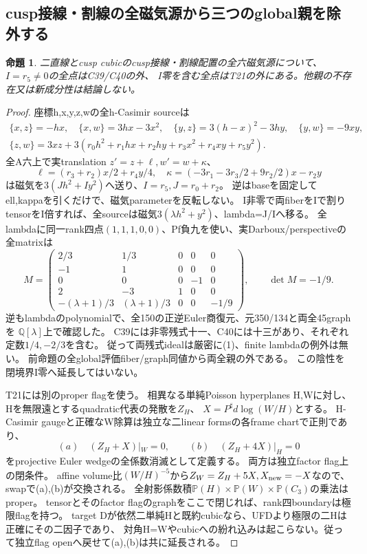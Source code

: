 \documentclass[a4paper,11pt]{ltjsarticle}
\newtheorem{proposition}{命題}[section]
\theoremstyle{definition}
\begin{document}
\subsection{cusp接線・割線の全磁気源から三つのglobal親を除外する}
\begin{proposition}\label{prop:cusp-tangent-secant-three-parent-exclusion}
二直線とcusp cubicのcusp接線・割線配置の全六磁気源について、$I=r_5\ne0$の全点はC39/C40の外、
I零を含む全点はT21の外にある。他親の不存在又は新成分性は結論しない。
\end{proposition}
\begin{proof}
座標h,x,y,z,wの全h-Casimir sourceは
\[
\begin{gathered}
 \{x,z\}=-hx,\quad\{x,w\}=3hx-3x^2,\quad
 \{y,z\}=3(h-x)^2-3hy,\quad\{y,w\}=-9xy,\\
 \{z,w\}=3xz+3(r_0h^2+r_1hx+r_2hy+r_3x^2+r_4xy+r_5y^2).
\end{gathered}
\]
全A六上で実translation $z'=z+\ell,w'=w+\kappa$、
\[
 \ell=(r_3+r_2)x/2+r_4y/4,\quad
 \kappa=(-3r_1-3r_3/2+9r_2/2)x-r_2y
\]
は磁気を$3(Jh^2+Iy^2)$へ送り、$I=r_5,J=r_0+r_2$。
逆はbaseを固定してell,kappaを引くだけで、磁気parameterを反転しない。
I非零で両fiberをIで割りtensorをI倍すれば、全sourceは磁気$3(\lambda h^2+y^2)$、lambda=J/Iへ移る。
全lambdaに同一rank四点$(1,1,1,0,0)$、Pf負九を使い、実Darboux/perspectiveの全matrixは
\[
 M=\begin{pmatrix}
 2/3&1/3&0&0&0\\-1&1&0&0&0\\0&0&0&-1&0\\2&-3&1&0&0\\
 -(\lambda+1)/3&(\lambda+1)/3&0&0&-1/9
 \end{pmatrix},\qquad\det M=-1/9.
\]
逆もlambdaのpolynomialで、全150の正逆Euler商復元、元350/134と両全45graphを
$\mathbb Q[\lambda]$上で確認した。
C39には非零残式十一、C40には十三があり、それぞれ定数$1/4,-2/3$を含む。
従って両残式idealは厳密に(1)、finite lambdaの例外は無い。
前命題の全global評価fiber/graph同値から両全親の外である。
この陰性を閉境界I零へ延長してはいない。

T21には別のproper flagを使う。
相異なる単純Poisson hyperplanes H,Wに対し、Hを無限遠とするquadratic代表の発散を$Z_H$、
$X=P^\sharp d\log(W/H)$とする。
H-Casimir gaugeと正確なW除算は独立な二linear formsの各frame chartで正則であり、
\[
 (a)\quad (Z_H+X)|_W=0,\qquad
 (b)\quad (Z_H+4X)|_H=0
\]
をprojective Euler wedgeの全係数消滅として定義する。
両方は独立factor flag上の閉条件。
affine volume比$(W/H)^{-5}$から$Z_W=Z_H+5X,X_{\rm new}=-X$なので、swapで(a),(b)が交換される。
全射影係数積$\mathbb P(H)\times\mathbb P(W)\times\mathbb P(C_3)$の乗法はproper。
tensorとそのfactor flagのgraphをここで閉じれば、rank四boundaryは極限flagを持つ。
target Dが依然二単純Hと既約cubicなら、UFDより極限の二Hは正確にその二因子であり、
対角H=Wやcubicへの紛れ込みは起こらない。従って独立flag openへ戻せて(a),(b)は共に延長される。


\end{proof}
\end{document}
